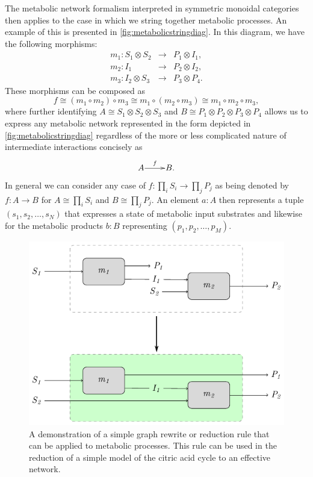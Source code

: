 The metabolic network formalism interpreted in symmetric monoidal categories then applies to the case in which we string together metabolic processes. An example of this is presented in \ref{fig:metabolicstringdiag}. In this diagram, we have the following morphisms:
\begin{eqnarray*}
m_1 \colon S_1 \otimes S_2 &\longrightarrow& P_1 \otimes I_1,\\
m_2 \colon I_1 &\longrightarrow& P_2 \otimes I_2,\\
m_3 \colon I_2 \otimes S_3 &\longrightarrow& P_3 \otimes P_4.
\end{eqnarray*}
These morphisms can be composed as
$$
f \cong (m_1 \circ m_2) \circ m_3 \cong m_1 \circ (m_2 \circ m_3) \cong m_1 \circ m_2 \circ m_3,
$$
where further identifying $A \cong S_1 \otimes S_2 \otimes S_3$ and $B \cong P_1 \otimes P_2 \otimes P_3 \otimes P_4$ allows us to express any metabolic network represented in the form depicted in \ref{fig:metabolicstringdiag} regardless of the more or less complicated nature of intermediate interactions concisely as
$$
\xymatrix@1{
	A\ar[r]^-{f} & B.
	}
$$
In general we can consider any case of $f \colon \prod_i S_i \rightarrow \prod_j P_j$ as being denoted by $f \colon A \rightarrow B$ for $A \cong \prod_i S_i$ and $B \cong \prod_j P_j$. An element $a \colon A$ then represents a tuple $(s_1, s_2, \ldots, s_N)$ that expresses a state of metabolic input substrates and likewise for the metabolic products $b \colon B$ representing $(p_1, p_2, \ldots, p_M)$.

\begin{figure}
\begin{center}
\noindent\includegraphics[width=0.5\columnwidth]{fig/blockassoclaw.pdf}
\end{center}
\caption{A demonstration of a simple graph rewrite or reduction rule that can be applied to metabolic processes. This rule can be used in the reduction of a simple model of the citric acid cycle to an effective network.}
\label{fig:stringassoclaw}
\end{figure}

